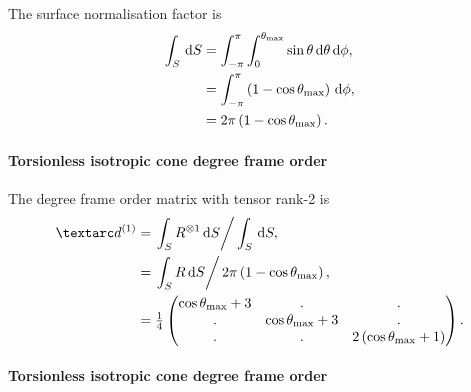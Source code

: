 The surface normalisation factor is
\begin{subequations}
\begin{align}
    \int_S \,\mathrm{d} S &= \int_{-\pi}^{\pi} \int_{0}^{\theta_\textrm{max}} \sin\theta \,\mathrm{d}\theta \,\mathrm{d}\phi , \\
                   &= \int_{-\pi}^{\pi} \left( 1 - \cos\theta_\textrm{max} \right) \,\mathrm{d}\phi , \\
                   &= 2\pi \left( 1 - \cos\theta_\textrm{max} \right) .
\end{align}
\end{subequations}


\paragraph{Torsionless isotropic cone  degree frame order}

The  degree frame order matrix with tensor rank-2 is
\begin{subequations} \label{eq: iso cone, torsionless 1st degree frame order matrix}
\begin{align}
    \FOone &= \left. \int_S R^{\otimes 1} \diff S \right / \int_S \diff S , \\
           &= \left. \int_S R \diff S \right / 2\pi \left( 1 - \cos\conethetamax \right) , \\
           &= \quart \begin{pmatrix}
                  \cos\conethetamax + 3 & .                     & . \\
                  .                     & \cos\conethetamax + 3 & . \\
                  .                     & .                     & 2\left( \cos\conethetamax + 1 \right) \\
              \end{pmatrix} .
\end{align}
\end{subequations}


\paragraph{Torsionless isotropic cone  degree frame order}

